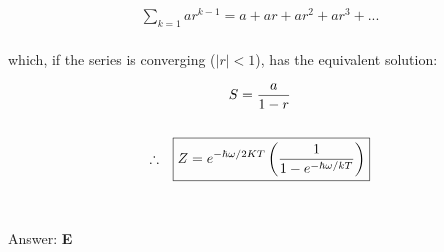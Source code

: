 \documentclass{article}
\begin{document}
\begin{gather}
\sum_{k=1} ar^{k-1} = a + ar + ar^{2} + ar^{3} + ...
\end{gather}
\\
which, if the series is converging ($|r| < 1$),  has the equivalent solution:

\begin{gather}
S = \frac{a}{1-r}\\
\nonumber\\
\therefore \hspace{.1in} \boxed{Z = e^{- \hbar \omega/2KT} \left(   \frac{1}{1 - e^{-  \hbar \omega/kT}}  \right)} \nonumber
\end{gather}
\\\\
Answer: \textbf{\textcolor{ProcessBlue}E}\\
\end{document}
